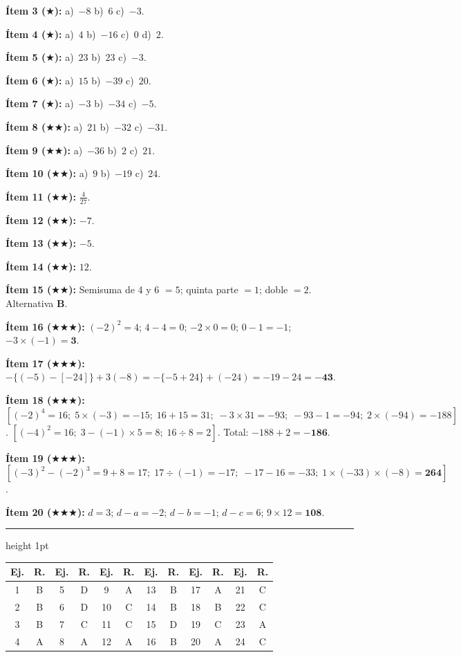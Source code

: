 \documentclass[11pt, letterpaper]{article}
\newcommand{\subbloque}[1]{%
  \vspace{14pt}
  \noindent{\large\bfseries\color{zenitnavy} #1}\par
  \vspace{4pt}\hrule height 1pt\vspace{8pt}}
\begin{document}
\textbf{\'Item 3 ($\bigstar$):} a)~$-8$ \; b)~$6$ \; c)~$-3$.

\textbf{\'Item 4 ($\bigstar$):} a)~$4$ \; b)~$-16$ \; c)~$0$ \; d)~$2$.

\textbf{\'Item 5 ($\bigstar$):} a)~$23$ \; b)~$23$ \; c)~$-3$.

\textbf{\'Item 6 ($\bigstar$):} a)~$15$ \; b)~$-39$ \; c)~$20$.

\textbf{\'Item 7 ($\bigstar$):} a)~$-3$ \; b)~$-34$ \; c)~$-5$.

\textbf{\'Item 8 ($\bigstar\bigstar$):} a)~$21$ \; b)~$-32$ \; c)~$-31$.

\textbf{\'Item 9 ($\bigstar\bigstar$):} a)~$-36$ \; b)~$2$ \; c)~$21$.

\textbf{\'Item 10 ($\bigstar\bigstar$):} a)~$9$ \; b)~$-19$ \; c)~$24$.

\textbf{\'Item 11 ($\bigstar\bigstar$):} $\frac{4}{27}$.

\textbf{\'Item 12 ($\bigstar\bigstar$):} $-7$.

\textbf{\'Item 13 ($\bigstar\bigstar$):} $-5$.

\textbf{\'Item 14 ($\bigstar\bigstar$):} $12$.

\textbf{\'Item 15 ($\bigstar\bigstar$):} Semisuma de 4 y 6 $=5$; quinta parte $=1$; doble $=2$. Alternativa \textbf{B}.

\textbf{\'Item 16 ($\bigstar\bigstar\bigstar$):} $(-2)^2=4$; $4-4=0$; $-2\times 0=0$; $0-1=-1$; $-3\times(-1)=\mathbf{3}$.

\textbf{\'Item 17 ($\bigstar\bigstar\bigstar$):} $-\{(-5)-[-24]\}+3(-8)=-\{-5+24\}+(-24)=-19-24=\mathbf{-43}$.

\textbf{\'Item 18 ($\bigstar\bigstar\bigstar$):} $[(-2)^4=16;\;5\times(-3)=-15;\;16+15=31;\;-3\times 31=-93;\;-93-1=-94;\;2\times(-94)=-188]$. $[(-4)^2=16;\;3-(-1)\times 5=8;\;16\div 8=2]$. Total: $-188+2=\mathbf{-186}$.

\textbf{\'Item 19 ($\bigstar\bigstar\bigstar$):} $[(-3)^2-(-2)^3=9+8=17;\;17\div(-1)=-17;\;-17-16=-33;\;1\times(-33)\times(-8)=\mathbf{264}]$.

\textbf{\'Item 20 ($\bigstar\bigstar\bigstar$):} $d=3$; $d-a=-2$; $d-b=-1$; $d-c=6$; $9\times 12=\mathbf{108}$.

\subbloque{Ejercicios tipo PAES}

\begin{center}
\renewcommand{\arraystretch}{1.3}
\begin{tabular}{c|c||c|c||c|c||c|c||c|c||c|c}
\toprule
\textbf{Ej.} & \textbf{R.} & \textbf{Ej.} & \textbf{R.} & \textbf{Ej.} & \textbf{R.} & \textbf{Ej.} & \textbf{R.} & \textbf{Ej.} & \textbf{R.} & \textbf{Ej.} & \textbf{R.}\\
\midrule
1 & B & 5 & D & 9  & A & 13 & B & 17 & A & 21 & C\\
2 & B & 6 & D & 10 & C & 14 & B & 18 & B & 22 & C\\
3 & B & 7 & C & 11 & C & 15 & D & 19 & C & 23 & A\\
4 & A & 8 & A & 12 & A & 16 & B & 20 & A & 24 & C\\
\bottomrule
\end{tabular}
\end{center}
\end{document}

